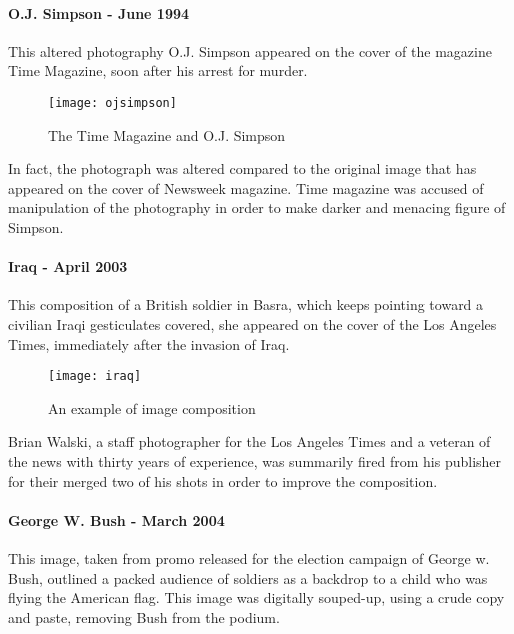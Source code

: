 \paragraph{O.J. Simpson - June 1994}

This altered photography O.J. Simpson appeared on the cover of the magazine Time Magazine, soon after his arrest for murder. 

\begin{wrapfigure}{r}{0.5\textwidth}
  \begin{center}
    \texttt{[image: ojsimpson]}
  \end{center}
  \caption{The Time Magazine and O.J. Simpson}
  \vspace{-1cm}
\end{wrapfigure}

In fact, the photograph was altered compared to the original image that has appeared on the cover of Newsweek magazine. Time magazine was accused of manipulation of the photography in order to make darker and menacing figure of Simpson.

\paragraph{Iraq - April 2003}

This composition of a British soldier in Basra, which keeps pointing toward a civilian Iraqi gesticulates covered, she appeared on the cover of the Los Angeles Times, immediately after the invasion of Iraq. 

\begin{wrapfigure}{l}{0.5\textwidth}
  \begin{center}
    \texttt{[image: iraq]}
  \end{center}
  \caption{An example of image composition}
\end{wrapfigure}

Brian Walski, a staff photographer for the Los Angeles Times and a veteran of the news with thirty years of experience, was summarily fired from his publisher for their merged two of his shots in order to improve the composition.

\paragraph{George W. Bush - March 2004}

This image, taken from promo released for the election campaign of George w. Bush, outlined a packed audience of soldiers as a backdrop to a child who was flying the American flag. This image was digitally souped-up, using a crude copy and paste, removing Bush from the podium. 

